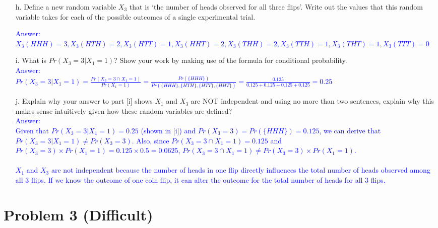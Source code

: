 \documentclass[letterpaper, 11pt]{article}
\begin{document}
\begin{itemize}
\item[h.] Define a new random variable $X_3$ that is `the number of heads observed for all three flips'.  Write out the values that this random variable takes for each of the possible outcomes of a single experimental trial. 


\textcolor{blue}{Answer:\\
$X_3(HHH) = 3, X_3(HTH) = 2, X_3(HTT) = 1, X_3(HHT) = 2, X_3(THH) = 2, X_3(TTH) = 1, X_3(THT) = 1, X_3(TTT) = 0$}\\

\item[i.] What is $Pr(X_3 =3 | X_1 = 1)$?  Show your work by making use of the formula for conditional probability.\\

\textcolor{blue}{Answer:\\
$Pr(X_3 = 3 | X_1 = 1) = \frac{Pr(X_3 = 3 \cap X_1 = 1)}{Pr(X_1 = 1)} = \frac{Pr(\{HHH\})}{Pr(\{HHH\}, \{HTH\}, \{HTT\}, \{HHT\})} = \frac{0.125}{0.125 + 0.125 + 0.125 + 0.125} = 0.25$ 
}\\

\item[j.] Explain why your answer to part [i] shows $X_1$ and $X_3$ are NOT independent and using no more than two sentences, explain why this makes sense intuitively given how these random variables are defined?\\

\textcolor{blue}{Answer:\\
Given that $Pr(X_3 = 3 | X_1 = 1) = 0.25$ (shown in [i]) and $Pr(X_3 = 3) = Pr(\{HHH\}) = 0.125$, we can derive that $Pr(X_3 = 3 | X_1 = 1) \neq Pr(X_3 = 3)$. Also, since $Pr(X_3 = 3 \cap X_1 = 1) = 0.125$ and $Pr(X_3 = 3) \times Pr(X_1 = 1) = 0.125 \times 0.5 = 0.0625$, $Pr(X_3 = 3 \cap X_1 = 1) \neq Pr(X_3 = 3) \times Pr(X_1 = 1)$.}\\
\\
\textcolor{blue}{
$X_1$ and $X_3$ are not independent because the number of heads in one flip directly influences the total number of heads observed among all 3 flips. If we know the outcome of one coin flip, it can alter the outcome for the total number of heads for all 3 flips.}\\

\end{itemize}


\section*{Problem 3 (Difficult)}
\end{document}
